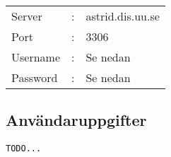 \documentclass{article}
\begin{document}
  \paragraph{}
    \begin{tabular}{l c l}
    Server & : & astrid.dis.uu.se \\
    Port & : & 3306 \\
    Username & : & Se nedan \\
    Password & : & Se nedan \\
    \end{tabular}

  \subsection*{Användaruppgifter}
    \texttt{TODO...} \\
\end{document}
